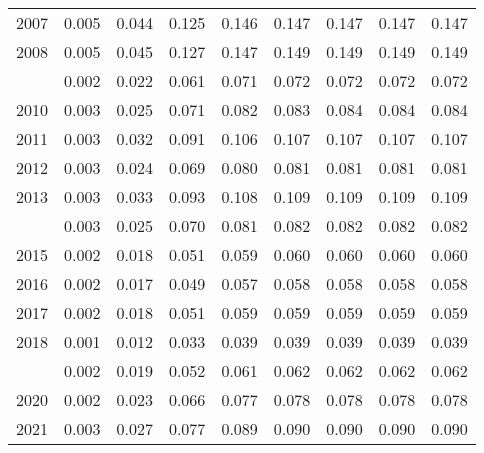 \documentclass[
]{article}
\begin{document}
\begin{longtable}[t]{lrrrrrrrr}
2007 & 0.005 & 0.044 & 0.125 & 0.146 & 0.147 & 0.147 & 0.147 & 0.147\\
2008 & 0.005 & 0.045 & 0.127 & 0.147 & 0.149 & 0.149 & 0.149 & 0.149\\
\addlinespace
2009 & 0.002 & 0.022 & 0.061 & 0.071 & 0.072 & 0.072 & 0.072 & 0.072\\
2010 & 0.003 & 0.025 & 0.071 & 0.082 & 0.083 & 0.084 & 0.084 & 0.084\\
2011 & 0.003 & 0.032 & 0.091 & 0.106 & 0.107 & 0.107 & 0.107 & 0.107\\
2012 & 0.003 & 0.024 & 0.069 & 0.080 & 0.081 & 0.081 & 0.081 & 0.081\\
2013 & 0.003 & 0.033 & 0.093 & 0.108 & 0.109 & 0.109 & 0.109 & 0.109\\
\addlinespace
2014 & 0.003 & 0.025 & 0.070 & 0.081 & 0.082 & 0.082 & 0.082 & 0.082\\
2015 & 0.002 & 0.018 & 0.051 & 0.059 & 0.060 & 0.060 & 0.060 & 0.060\\
2016 & 0.002 & 0.017 & 0.049 & 0.057 & 0.058 & 0.058 & 0.058 & 0.058\\
2017 & 0.002 & 0.018 & 0.051 & 0.059 & 0.059 & 0.059 & 0.059 & 0.059\\
2018 & 0.001 & 0.012 & 0.033 & 0.039 & 0.039 & 0.039 & 0.039 & 0.039\\
\addlinespace
2019 & 0.002 & 0.019 & 0.052 & 0.061 & 0.062 & 0.062 & 0.062 & 0.062\\
2020 & 0.002 & 0.023 & 0.066 & 0.077 & 0.078 & 0.078 & 0.078 & 0.078\\
2021 & 0.003 & 0.027 & 0.077 & 0.089 & 0.090 & 0.090 & 0.090 & 0.090\\*
\end{longtable}
\end{document}
